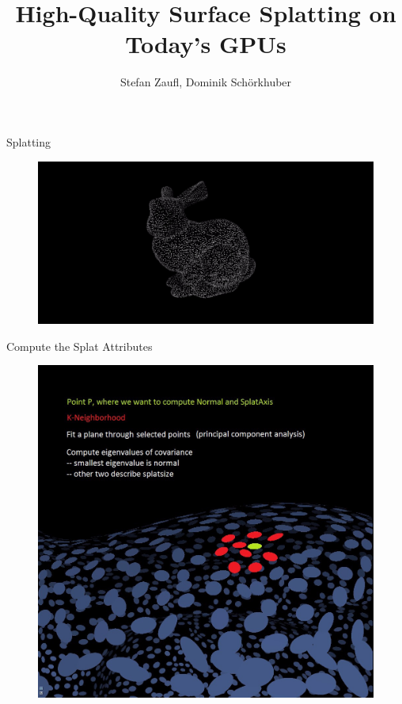 \documentclass[16pt]{beamer}
\author{Stefan Zaufl, Dominik Schörkhuber}
\title{High-Quality Surface Splatting on Today's GPUs}
\begin{document}
\begin{frame}
\titlepage
\end{frame}


\begin{frame}{Splatting}
\begin{figure}[hbtp]
\centering
\includegraphics[width=\textwidth]{img/bunny_small}
\end{figure}
\end{frame}

\begin{frame}{Compute the Splat Attributes}
\begin{figure}[hbtp]
\centering
\includegraphics[width=\textwidth]{img/splat_neighbours}
\end{figure}
\end{frame}
\end{document}

